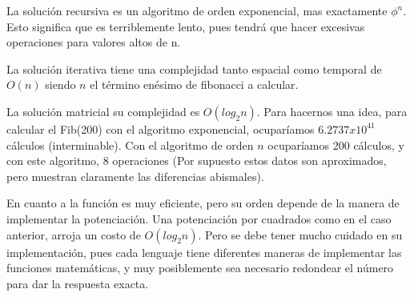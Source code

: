 La solución recursiva es un algoritmo de orden exponencial, mas exactamente  $\phi^n$. Esto significa que es terriblemente lento, pues tendrá que hacer excesivas operaciones para valores altos de n.

La solución iterativa tiene una complejidad tanto espacial como temporal de $O(n)$ siendo $n$ el término enésimo de fibonacci a calcular.

La solución matricial su complejidad es $O(log_{2}n)$. Para hacernos una idea, para calcular el Fib(200) con el algoritmo exponencial, ocuparíamos $6.2737x10^{41}$ cálculos (interminable). Con el algoritmo de orden $n$ ocuparíamos 200 cálculos, y con este algoritmo, 8 operaciones (Por supuesto estos datos son aproximados, pero muestran claramente las diferencias abismales).

En cuanto a la función es muy eficiente, pero su orden depende de la manera de implementar la potenciación. Una potenciación por cuadrados como en el caso anterior, arroja un costo de $O(log_{2}n)$. Pero se debe tener mucho cuidado en su implementación, pues cada lenguaje tiene diferentes maneras de implementar las funciones matemáticas, y muy posiblemente sea necesario redondear el número para dar la respuesta exacta.